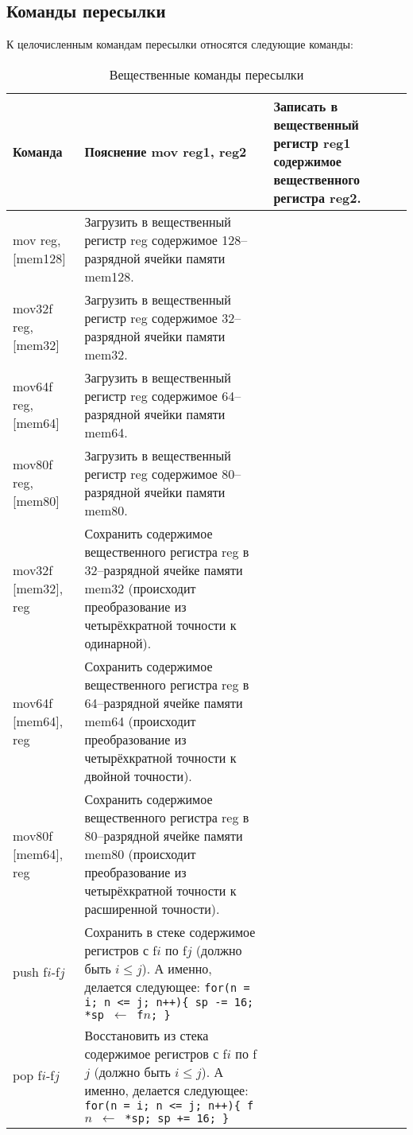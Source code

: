 \documentclass[10pt]{report}
\begin{document}
        \subsection{Команды пересылки}
К целочисленным командам пересылки относятся следующие команды:
\begin{longtable}[c]{|l|p{12.5cm}|}
\caption{Вещественные команды пересылки} \\ \hline
{\textbf{Команда}}    & \textbf{Пояснение} \endhead \hline 
mov reg1, reg2        & Записать в вещественный регистр reg1 содержимое вещественного регистра reg2. \\ \hline 
mov reg, [mem128]     & Загрузить в вещественный регистр reg содержимое 128--разрядной ячейки памяти mem128. \\ \hline 
mov32f reg, [mem32]   & Загрузить в вещественный регистр reg содержимое 32--разрядной ячейки памяти mem32. \\ \hline 
mov64f reg, [mem64]   & Загрузить в вещественный регистр reg содержимое 64--разрядной ячейки памяти mem64. \\ \hline 
mov80f reg, [mem80]   & Загрузить в вещественный регистр reg содержимое 80--разрядной ячейки памяти mem80. \\ \hline 
mov32f [mem32], reg   & Сохранить содержимое вещественного регистра reg в 32--разрядной ячейке памяти mem32 (происходит преобразование из четырёхкратной точности к одинарной).\\ \hline
mov64f [mem64], reg   & Сохранить содержимое вещественного регистра reg в 64--разрядной ячейке памяти mem64 (происходит преобразование из четырёхкратной точности к двойной точности).\\ \hline
mov80f [mem64], reg   & Сохранить содержимое вещественного регистра reg в 80--разрядной ячейке памяти mem80 (происходит преобразование из четырёхкратной точности к расширенной точности).\\ \hline
push f$i$-f$j$        & {\parbox{12.3cm}{Сохранить в стеке содержимое регистров с  f$i$ по f$j$ (должно быть $i\leqslant j$). А именно, делается следующее:\\
\texttt{for(n = i; n <= j; n++)\{\\
\phantom{aaaa}sp -= 16;\\
\phantom{aaaa}*sp $\leftarrow$ f$n$;\\
\} }
}}  \\ \hline
pop f$i$-f$j$        & {\parbox{12.3cm}{Восстановить из стека содержимое регистров с  f$i$ по f$j$ (должно быть $i\leqslant j$). А именно, делается следующее:\\
\texttt{for(n = i; n <= j; n++)\{\\
\phantom{aaaa}f$n$ $\leftarrow$ *sp;\\
\phantom{aaaa}sp += 16;\\
\} }
}}  \\ \hline
\end{longtable}    
\end{document}
